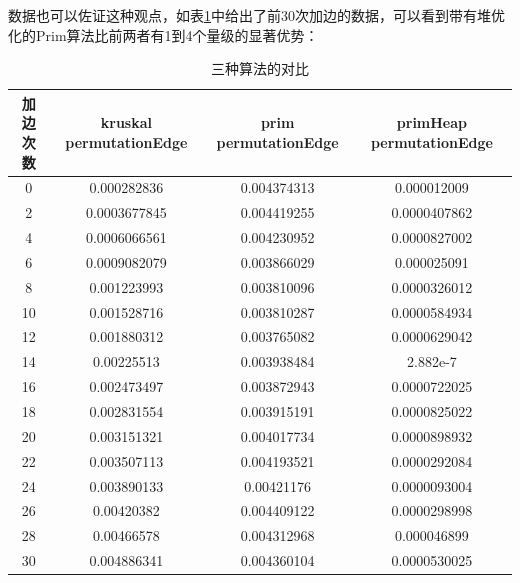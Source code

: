 \documentclass[UTF8]{ctexart}
\begin{document}
数据也可以佐证这种观点，如表\ref{tab:primheap}中给出了前30次加边的数据，可以看到带有堆优化的Prim算法比前两者有1到4个量级的显著优势：
\begin{table}[htbp]
    \begin{tabular}{|c|c|c|c|}
    \hline
    加边次数 & kruskal permutationEdge & prim permutationEdge & primHeap permutationEdge \\ \hline
    0    & 0.000282836             & 0.004374313          & 0.000012009              \\ \hline
    2    & 0.0003677845            & 0.004419255          & 0.0000407862             \\ \hline
    4    & 0.0006066561            & 0.004230952          & 0.0000827002             \\ \hline
    6    & 0.0009082079            & 0.003866029          & 0.000025091              \\ \hline
    8    & 0.001223993             & 0.003810096          & 0.0000326012             \\ \hline
    10   & 0.001528716             & 0.003810287          & 0.0000584934             \\ \hline
    12   & 0.001880312             & 0.003765082          & 0.0000629042             \\ \hline
    14   & 0.00225513              & 0.003938484          & 2.882e-7                 \\ \hline
    16   & 0.002473497             & 0.003872943          & 0.0000722025             \\ \hline
    18   & 0.002831554             & 0.003915191          & 0.0000825022             \\ \hline
    20   & 0.003151321             & 0.004017734          & 0.0000898932             \\ \hline
    22   & 0.003507113             & 0.004193521          & 0.0000292084             \\ \hline
    24   & 0.003890133             & 0.00421176           & 0.0000093004             \\ \hline
    26   & 0.00420382              & 0.004409122          & 0.0000298998             \\ \hline
    28   & 0.00466578              & 0.004312968          & 0.000046899              \\ \hline
    30   & 0.004886341             & 0.004360104          & 0.0000530025             \\ \hline
    \end{tabular}
    \caption{三种算法的对比}
    \label{tab:primheap}
\end{table}
\end{document}
